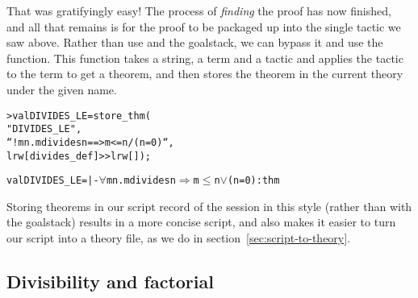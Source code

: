 That was gratifyingly easy!
The process of {\it finding\/} the proof has now finished, and all that remains is for the proof to be packaged up into the single tactic we saw above.
Rather than use  and the goalstack, we can bypass it and use the  function.
This function takes a string, a term and a tactic and applies the tactic to the term to get a theorem, and then stores the theorem in the current theory under the given name.
\begin{session}
\begin{alltt}
> val DIVIDES_LE = store_thm(
    "DIVIDES_LE",
     ``!m n. m divides n ==> m <= n \bs{}/ (n = 0)``,
     lrw[divides_def] >> lrw[]);

val DIVIDES_LE = |- \(\forall\)m n. m divides n \(\Rightarrow\) m \(\le\) n \(\lor\) (n = 0) : thm
\end{alltt}
\end{session}
Storing theorems in our script record of the session in this style
(rather than with the goalstack) results in a more concise script, and
also makes it easier to turn our script into a theory file, as we do
in section~\ref{sec:script-to-theory}.

\subsection{Divisibility and factorial}

